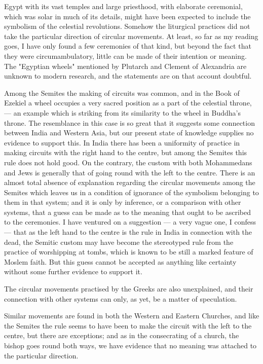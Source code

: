 \documentclass[a4paper, 11pt, oneside, polutonikogreek, english]{article}
\begin{document}
Egypt with its vast temples and large priesthood, with elaborate ceremonial, which was solar in much of its details, might have been expected to include the symbolism of the celestial revolutions. Somehow the liturgical practices did not take the particular direction of circular movements. At least, so far as my reading goes, I have only found a few ceremonies of that kind, but beyond the fact that they were circumambulatory, little can be made of their intention or meaning. The "Egyptian wheels" mentioned by Plutarch and Clement of Alexandria are unknown to modern research, and the statements are on that account doubtful.

Among the Semites the making of circuits was common, and in the Book of Ezekiel a wheel occupies a very sacred position as a part of the celestial throne, --- an example which is striking from its similarity to the wheel in Buddha's throne. The resemblance in this case is so great that it suggests some connection between India and Western Asia, but our present state of knowledge supplies no evidence to support this. In India there has been a uniformity of practice in making circuits with the right hand to the centre, but among the Semites this rule does not hold good. On the contrary, the custom with both Mohammedans and Jews is generally that of going round with the left to the centre. There is an almost total absence of explanation regarding the circular movements among the Semites which leaves us in a condition of ignorance of the symbolism belonging to them in that system; and it is only by inference, or a comparison with other systems, that a guess can be made as to the meaning that ought to be ascribed to the ceremonies. I have ventured on a suggestion --- a very vague one, I confess --- that as the left hand to the centre is the rule in India in connection with the dead, the Semitic custom may have become the stereotyped rule from the practice of worshipping at tombs, which is known to be still a marked feature of Moslem faith. But this guess cannot be accepted as anything like certainty without some further evidence to support it.

The circular movements practised by the Greeks are also unexplained, and their connection with other systems can only, as yet, be a matter of speculation.

Similar movements are found in both the Western and Eastern Churches, and like the Semites the rule seems to have been to make the circuit with the left to the centre, but there are exceptions; and as in the consecrating of a church, the bishop goes round both ways, we have evidence that no meaning was attached to the particular direction.
\end{document}
